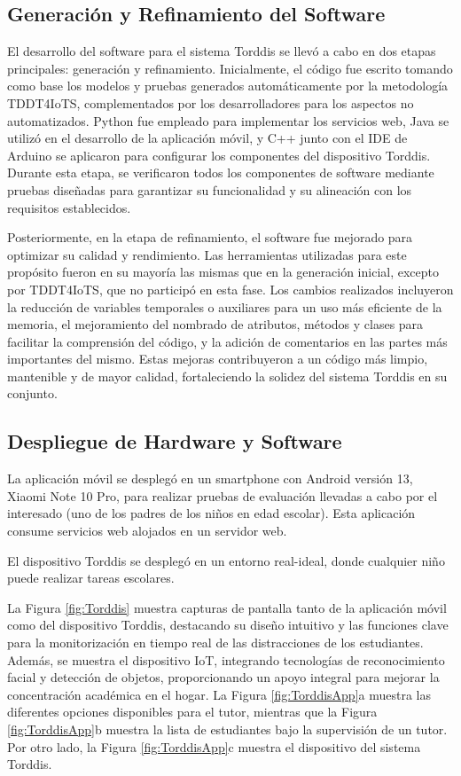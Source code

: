 \documentclass[a4paper,fleqn]{cas-sc}
\begin{document}
		\subsection{Generación y Refinamiento del Software} 
			El desarrollo del software para el sistema Torddis se llevó a cabo en dos etapas principales: generación y refinamiento. Inicialmente, el código fue escrito tomando como base los modelos y pruebas generados automáticamente por la metodología TDDT4IoTS, complementados por los desarrolladores para los aspectos no automatizados. Python fue empleado para implementar los servicios web, Java se utilizó en el desarrollo de la aplicación móvil, y C++ junto con el IDE de Arduino se aplicaron para configurar los componentes del dispositivo Torddis. Durante esta etapa, se verificaron todos los componentes de software mediante pruebas diseñadas para garantizar su funcionalidad y su alineación con los requisitos establecidos.
		
			Posteriormente, en la etapa de refinamiento, el software fue mejorado para optimizar su calidad y rendimiento. Las herramientas utilizadas para este propósito fueron en su mayoría las mismas que en la generación inicial, excepto por TDDT4IoTS, que no participó en esta fase. Los cambios realizados incluyeron la reducción de variables temporales o auxiliares para un uso más eficiente de la memoria, el mejoramiento del nombrado de atributos, métodos y clases para facilitar la comprensión del código, y la adición de comentarios en las partes más importantes del mismo. Estas mejoras contribuyeron a un código más limpio, mantenible y de mayor calidad, fortaleciendo la solidez del sistema Torddis en su conjunto.
		
		\subsection{Despliegue de Hardware y Software}
			La aplicación móvil se desplegó en un smartphone con Android versión 13, Xiaomi Note 10 Pro, para realizar pruebas de evaluación llevadas a cabo por el interesado (uno de los padres de los niños en edad escolar). Esta aplicación consume servicios web alojados en un servidor web.
		
			El dispositivo Torddis se desplegó en un entorno real-ideal, donde cualquier niño puede realizar tareas escolares.
		
			La Figura \ref{fig:Torddis} muestra capturas de pantalla tanto de la aplicación móvil como del dispositivo Torddis, destacando su diseño intuitivo y las funciones clave para la monitorización en tiempo real de las distracciones de los estudiantes. Además, se muestra el dispositivo IoT, integrando tecnologías de reconocimiento facial y detección de objetos, proporcionando un apoyo integral para mejorar la concentración académica en el hogar. La Figura \ref{fig:TorddisApp}a muestra las diferentes opciones disponibles para el tutor, mientras que la Figura \ref{fig:TorddisApp}b muestra la lista de estudiantes bajo la supervisión de un tutor. Por otro lado, la Figura \ref{fig:TorddisApp}c muestra el dispositivo del sistema Torddis.
		
\end{document}
